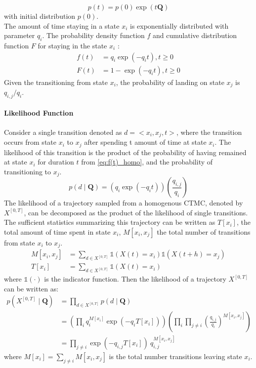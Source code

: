\begin{equation}
p(t)=p(0) \exp (t\textbf{Q})
\end{equation}
with initial distribution $ p(0) $.\\
The amount of time staying in a state $ x_{i} $ is exponentially distributed with parameter $ q_{i} $. The probability density function $ f $ and cumulative distribution function $ F $ for staying in the state $ x_{i} $ \cite{Nodelman1995}:
\begin{align}
f(t) & = q_{i} \exp \left(-q_{i} t\right), t\geq 0  \label{eq:f(t)_homo}\\
F(t) & = 1 - \exp \left(-q_{i} t\right), t\geq 0 
\end{align}
Given the transitioning from state $ x_{i} $, the probability of landing on state $ x_{j} $ is $ q_{i,j}/q_{i} $.
\paragraph*{Likelihood Function}
\label{sec:llh_of_homo}
Consider a single transition denoted as $ d = <x_{i},x_{j},t> $, where the transition occurs from state $ x_{i} $ to $ x_{j} $ after spending t amount of time at state $ x_{i} $. The likelihood of this transition is the product of the probability of having remained at state $ x_{i} $ for duration $ t $ from \autoref{eq:f(t)_homo}, and the probability of transitioning to $ x_{j} $.
\begin{equation}
p(d  \mid \textbf{Q}) = \left( q_{i}\exp(-q_{i}t) \right) \left( \frac{q_{i,j}}{q_{i}} \right)
\end{equation}
The likelihood of a trajectory sampled from a homogenous CTMC, denoted by $ X^{[0,T]} $, can be decomposed as the product of the likelihood of single transitions. The sufficient statistics summarizing this trajectory can be written as $ T[x_{i}] $, the total amount of time spent in state $ x_{i} $, $ M[x_{i}, x_{j}] $ the total number of transitions from state $ x_{i} $ to $ x_{j} $. 
\begin{align}
M[x_i,x_j] & = \sum_{d \in X^{[0,T]}} \mathbb{1}(X(t)=x_i)\mathbb{1}(X(t+h)=x_j)\\
T[x_i] &= \sum_{d \in X^{[0,T]}} \mathbb{1}(X(t)=x_i)
\end{align}
where $ \mathbb{1}(\cdot) $ is the indicator function. Then the likelihood of a trajectory $  X^{\left[0,T\right] } $ can be written as:
\begin{align}
p(X^{[0,T]}  \mid \textbf{Q}) &=  \prod_{d \in X^{[0,T]}} p(d \mid \textbf{Q}) \nonumber\\&=\left(\prod_{ i} q_{i}^{M[x_{i}]} \exp \left(-q_{i} T[x_{i}]\right)\right)\left(\prod_{ i} \prod_{ j \neq i} \left(\frac{q_{i,j}}{q_{i}}\right)^{M\left[x_{i}, x_{j}\right]}\right) \nonumber\\ & = \prod_{j \neq i}  \exp(-q_{i,j}T[x_{i}])\ q_{i,j}^{M[x_{i},x_{j}]}
\label{eq:lh_traj_homo}
\end{align}
where $ M[x_{i}] = \sum_{j \neq i} M[x_{i}, x_{j}] $ is the total number transitions leaving state $ x_{i} $.

